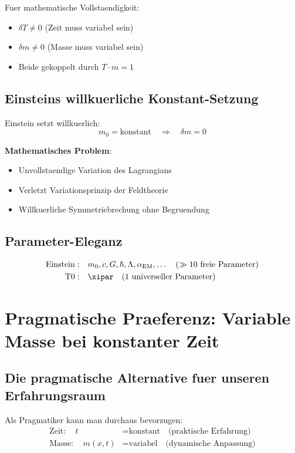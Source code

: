 	Fuer mathematische Vollstaendigkeit:
	\begin{itemize}
		\item $\delta T \neq 0$ (Zeit muss variabel sein)
		\item $\delta m \neq 0$ (Masse muss variabel sein)
		\item Beide gekoppelt durch $T \cdot m = 1$
	\end{itemize}
	
	\subsection{Einsteins willkuerliche Konstant-Setzung}
	
	Einstein setzt willkuerlich:
	\begin{equation}
		m_0 = \text{konstant} \quad \Rightarrow \quad \delta m = 0
	\end{equation}
	
	\textbf{Mathematisches Problem}:
	\begin{itemize}
		\item Unvollstaendige Variation des Lagrangians
		\item Verletzt Variationsprinzip der Feldtheorie
		\item Willkuerliche Symmetriebrechung ohne Begruendung
	\end{itemize}
	
	\subsection{Parameter-Eleganz}
	
	\begin{align}
		\text{Einstein}: \quad &m_0, c, G, \hbar, \Lambda, \alpha_{\text{EM}}, \ldots \quad (\gg 10 \text{ freie Parameter}) \\
		\text{T0}: \quad &\xipar \quad (1 \text{ universeller Parameter})
	\end{align}
	
	\section{Pragmatische Praeferenz: Variable Masse bei konstanter Zeit}
	
	\subsection{Die pragmatische Alternative fuer unseren Erfahrungsraum}
	
	Als Pragmatiker kann man durchaus bevorzugen:
	\begin{align}
		\text{Zeit}: \quad t &= \text{konstant} \quad \text{(praktische Erfahrung)} \\
		\text{Masse}: \quad m(x,t) &= \text{variabel} \quad \text{(dynamische Anpassung)}
	\end{align}
	
